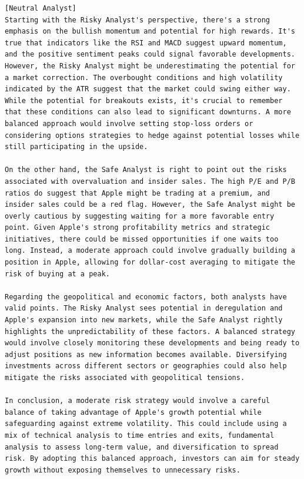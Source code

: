 \begin{tcolorbox}[
    breakable,
    enhanced,
    colback=lightred!50!white,
    colframe=red!25!gray,
    coltitle=black,
    boxrule=0.5pt,
    arc=0.5mm,
    top=2mm, bottom=2mm, left=2mm, right=2mm,
    fonttitle=\usefont{T1}{ppl}{b}{n},
    title=\model: Risk Management Team Neutral Agent -- Apple (AAPL),
]
\footnotesize
\begin{lstlisting}[style=agentbase]
[Neutral Analyst]
Starting with the Risky Analyst's perspective, there's a strong emphasis on the bullish momentum and potential for high rewards. It's true that indicators like the RSI and MACD suggest upward momentum, and the positive sentiment peaks could signal favorable developments. However, the Risky Analyst might be underestimating the potential for a market correction. The overbought conditions and high volatility indicated by the ATR suggest that the market could swing either way. While the potential for breakouts exists, it's crucial to remember that these conditions can also lead to significant downturns. A more balanced approach would involve setting stop-loss orders or considering options strategies to hedge against potential losses while still participating in the upside.

On the other hand, the Safe Analyst is right to point out the risks associated with overvaluation and insider sales. The high P/E and P/B ratios do suggest that Apple might be trading at a premium, and insider sales could be a red flag. However, the Safe Analyst might be overly cautious by suggesting waiting for a more favorable entry point. Given Apple's strong profitability metrics and strategic initiatives, there could be missed opportunities if one waits too long. Instead, a moderate approach could involve gradually building a position in Apple, allowing for dollar-cost averaging to mitigate the risk of buying at a peak.

Regarding the geopolitical and economic factors, both analysts have valid points. The Risky Analyst sees potential in deregulation and Apple's expansion into new markets, while the Safe Analyst rightly highlights the unpredictability of these factors. A balanced strategy would involve closely monitoring these developments and being ready to adjust positions as new information becomes available. Diversifying investments across different sectors or geographies could also help mitigate the risks associated with geopolitical tensions.

In conclusion, a moderate risk strategy would involve a careful balance of taking advantage of Apple's growth potential while safeguarding against extreme volatility. This could include using a mix of technical analysis to time entries and exits, fundamental analysis to assess long-term value, and diversification to spread risk. By adopting this balanced approach, investors can aim for steady growth without exposing themselves to unnecessary risks.
\end{lstlisting}
\end{tcolorbox}

